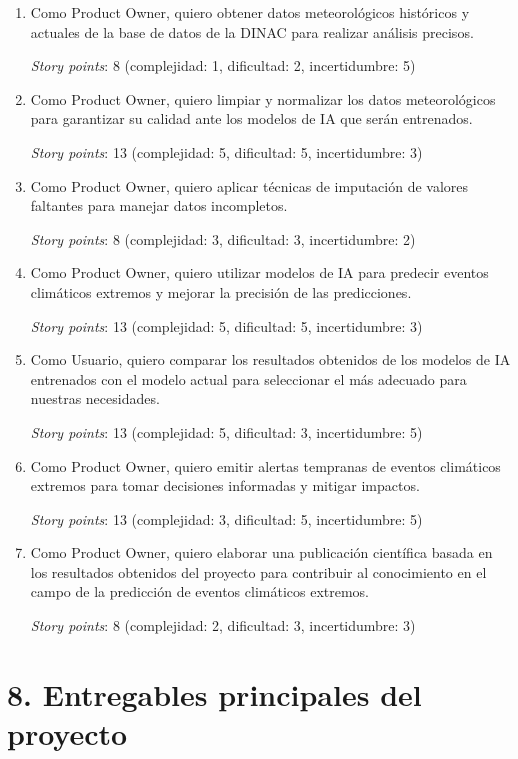 \documentclass[
11pt, %
codirector, %
]{charter}
\begin{document}
\begin{enumerate}
\item Como Product Owner, quiero obtener datos meteorológicos históricos y actuales de la base de datos de la DINAC para realizar análisis precisos.

\textit{Story points}: 8 (complejidad: 1, dificultad: 2, incertidumbre: 5)

\item Como Product Owner, quiero limpiar y normalizar los datos meteorológicos para garantizar su calidad ante los modelos de IA que serán entrenados.

\textit{Story points}: 13 (complejidad: 5, dificultad: 5, incertidumbre: 3)

\item Como Product Owner, quiero aplicar técnicas de imputación de valores faltantes para manejar datos incompletos.

\textit{Story points}: 8 (complejidad: 3, dificultad: 3, incertidumbre: 2)

\item Como Product Owner, quiero utilizar modelos de IA para predecir eventos climáticos extremos y mejorar la precisión de las predicciones.

\textit{Story points}: 13 (complejidad: 5, dificultad: 5, incertidumbre: 3)

\item Como Usuario, quiero comparar los resultados obtenidos de los modelos de IA entrenados con el modelo actual para seleccionar el más adecuado para nuestras necesidades.

\textit{Story points}: 13 (complejidad: 5, dificultad: 3, incertidumbre: 5)

\item Como Product Owner, quiero emitir alertas tempranas de eventos climáticos extremos para tomar decisiones informadas y mitigar impactos.

\textit{Story points}: 13 (complejidad: 3, dificultad: 5, incertidumbre: 5)

\item Como Product Owner, quiero elaborar una publicación científica basada en los resultados obtenidos del proyecto para contribuir al conocimiento en el campo de la predicción de eventos climáticos extremos.

\textit{Story points}: 8 (complejidad: 2, dificultad: 3, incertidumbre: 3)
\end{enumerate}

\section{8. Entregables principales del proyecto}
\label{sec:entregables}
\end{document}
